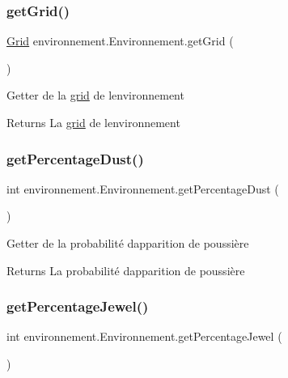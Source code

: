\subsubsection{\texorpdfstring{get\+Grid()}{getGrid()}}
{\footnotesize\ttfamily \hyperlink{classenvironnement_1_1_grid}{Grid} environnement.\+Environnement.\+get\+Grid (\begin{DoxyParamCaption}{ }\end{DoxyParamCaption})}

Getter de la \hyperlink{}{grid} de l\textquotesingle{}environnement \begin{DoxyReturn}{Returns}
La \hyperlink{}{grid} de l\textquotesingle{}environnement 
\end{DoxyReturn}
\hypertarget{classenvironnement_1_1_environnement_accb38c1ebc21db442c06f1c39f658853}{}\label{classenvironnement_1_1_environnement_accb38c1ebc21db442c06f1c39f658853} 
\subsubsection{\texorpdfstring{get\+Percentage\+Dust()}{getPercentageDust()}}
{\footnotesize\ttfamily int environnement.\+Environnement.\+get\+Percentage\+Dust (\begin{DoxyParamCaption}{ }\end{DoxyParamCaption})}

Getter de la probabilité d\textquotesingle{}apparition de poussière \begin{DoxyReturn}{Returns}
La probabilité d\textquotesingle{}apparition de poussière 
\end{DoxyReturn}
\hypertarget{classenvironnement_1_1_environnement_ab7f263c3832088e66b3e0b2b27882580}{}\label{classenvironnement_1_1_environnement_ab7f263c3832088e66b3e0b2b27882580} 
\subsubsection{\texorpdfstring{get\+Percentage\+Jewel()}{getPercentageJewel()}}
{\footnotesize\ttfamily int environnement.\+Environnement.\+get\+Percentage\+Jewel (\begin{DoxyParamCaption}{ }\end{DoxyParamCaption})}

